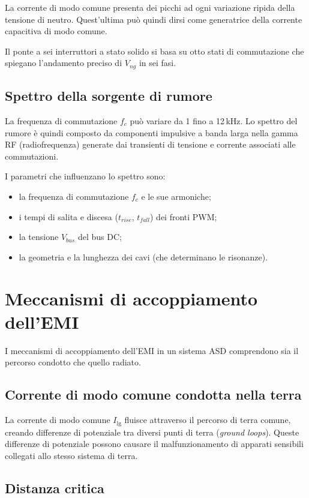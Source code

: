 La corrente di modo comune presenta dei picchi ad ogni variazione ripida della tensione di neutro. Quest'ultima può quindi dirsi come generatrice della corrente capacitiva di modo comune.

Il ponte a sei interruttori a stato solido si basa su otto stati di commutazione che spiegano l'andamento preciso di $V_{ng}$ in sei fasi.

\subsection{Spettro della sorgente di rumore}

La frequenza di commutazione $f_c$ può variare da 1 fino a 12\,kHz. Lo spettro del rumore è quindi composto da componenti impulsive a banda larga nella gamma RF (radiofrequenza) generate dai transienti di tensione e corrente associati alle commutazioni.

I parametri che influenzano lo spettro sono:
\begin{itemize}
\item la frequenza di commutazione $f_c$ e le sue armoniche;
\item i tempi di salita e discesa ($t_{rise}$, $t_{fall}$) dei fronti PWM;
\item la tensione $V_{bus}$ del bus DC;
\item la geometria e la lunghezza dei cavi (che determinano le risonanze).
\end{itemize}

\section{Meccanismi di accoppiamento dell'EMI}

I meccanismi di accoppiamento dell'EMI in un sistema ASD comprendono sia il percorso condotto che quello radiato.

\subsection{Corrente di modo comune condotta nella terra}

La corrente di modo comune $I_{\lg}$ fluisce attraverso il percorso di terra comune, creando differenze di potenziale tra diversi punti di terra (\textit{ground loops}). Queste differenze di potenziale possono causare il malfunzionamento di apparati sensibili collegati allo stesso sistema di terra.

\subsection{Distanza critica}

